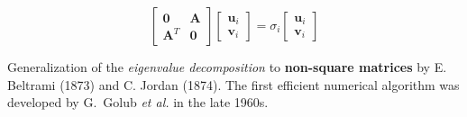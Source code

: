 \documentclass[aspectratio=169, usenames, dvipsnames]{beamer}
\begin{document}
\begin{frame}

  \vfill

  \begin{tcolorbox}[
    enhanced,
    coltitle=black,
    coltext=white,
    colback=black,
    title=\textbf{Relation to spectral decomposition},
    frame style tile={width=\paperwidth}{background.jpg}
    ]

  \bigskip

  {\large
  \[
  \begin{bmatrix}
    \bm{0} & \bm{A} \\
    \bm{A}^T & \bm{0}
  \end{bmatrix}
  \begin{bmatrix}
    \bm{u}_i \\ \bm{v}_i
  \end{bmatrix}
  =
  \sigma_i
  \begin{bmatrix}
    \bm{u}_i \\ \bm{v}_i
  \end{bmatrix}
  \]
  }

  \bigskip

  Generalization of the \emph{eigenvalue decomposition} to \textbf{non-square matrices} by E. Beltrami (1873) and C. Jordan (1874).
  The first efficient numerical algorithm was developed by G.\ Golub \emph{et al.} in the late 1960s.

  \end{tcolorbox}
  \vfill

\end{frame}

{

  \begin{frame}
    \vfill
    \centering

    \vfill
  \end{frame}
}
\end{document}
